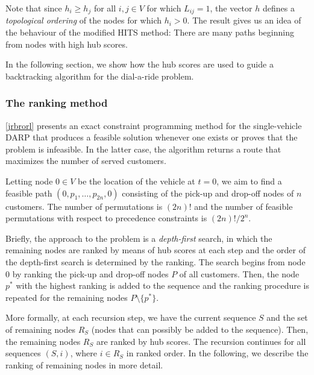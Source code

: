 \documentclass[dissertation,draft*]{aaltoseries}
\begin{document}
Note that since $h_i \geq h_j$ for all $i,j \in V$ for which $L_{ij} = 1$, the vector $h$ defines a \emph{topological
ordering} \cite{cormen} of the nodes for which $h_i > 0$.
The result gives us an idea of the behaviour of the modified HITS method: There are many paths beginning from 
nodes with high hub scores. 

In the following section, we show how the 
hub scores are used to guide 
a backtracking algorithm for the dial-a-ride problem.

\subsubsection{The ranking method}
\label{svsolution}
\ref{jrbrorl} presents an exact constraint programming method for the single-vehicle DARP that 
produces a feasible solution whenever one exists or proves that the problem is infeasible.
In the latter case, the algorithm returns a route that maximizes the number of served customers.

Letting node $0 \in V$ be the location of the vehicle at $t=0$,
we aim to find a feasible path $(0,p_1,\ldots,p_{2n},0)$
consisting of the pick-up and drop-off nodes of $n$ customers.
The number of permutations is $(2n)!$ and the number of feasible permutations
with respect to precedence constraints is $(2n)!/2^n$.

Briefly, the approach to the problem is a \emph{depth-first} search, in which the
remaining nodes are ranked by means of hub scores at each step and the order of the depth-first search is determined by the 
ranking. %
The search begins from node $0$ by ranking the pick-up and drop-off nodes $P$ of all customers.
Then, the node $p^{*}$ with the highest ranking is added to the sequence and the ranking procedure is
repeated for the remaining nodes $P \setminus \{p^{*}\}$.

More formally, at each recursion step, we have the current sequence $S$ 
and the set of remaining nodes $R_S$ (nodes that can possibly be added to the sequence). 
Then, the remaining nodes $R_S$ are ranked by hub scores.
The recursion continues for all sequences $(S,i)$, where $i \in R_S$ in ranked order.
In the following, we describe the ranking of remaining nodes in more detail.
\end{document}
